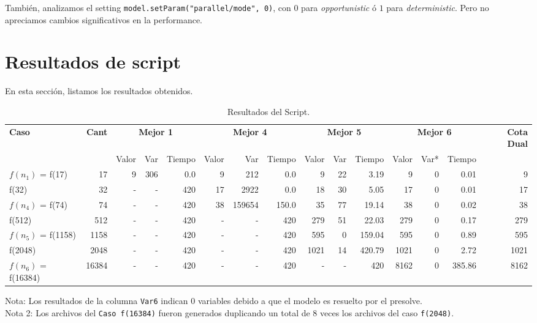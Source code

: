 \documentclass[11pt, a4paper, pdftex]{article}
\begin{document}
También, analizamos el setting \verb|model.setParam("parallel/mode", 0)|,
con $0$ para \emph{opportunistic} ó $1$ para \emph{deterministic}.
Pero no apreciamos cambios significativos en la performance.

\section{Resultados de script}

En esta sección, listamos los resultados obtenidos.

\newpage

\begin{landscape}
\begin{table}[h]
    \centering
    \begin{tabular}{l r r r r r r r r r r r r r r}
        \toprule
        \textbf{Caso} & \textbf{Cant} & \multicolumn{3}{c}{\textbf{Mejor 1}} & \multicolumn{3}{c}{\textbf{Mejor 4}} & \multicolumn{3}{c}{\textbf{Mejor 5}} & \multicolumn{3}{c}{\textbf{Mejor 6}} & \textbf{Cota Dual} \\
        \cmidrule(lr){3-5} \cmidrule(lr){6-8} \cmidrule(lr){9-11} \cmidrule(lr){12-14}
        & & Valor & Var & Tiempo & Valor & Var & Tiempo & Valor & Var & Tiempo & Valor & Var* & Tiempo & \\
        \midrule
        $f(n_1)$ = f(17) & 17 & 9 & 306 & 0.0 & 9 & 212 & 0.0 & 9 & 22 & 3.19 & 9 & 0 & 0.01 & 9 \\
        f(32) & 32 & - & - & 420 & 17 & 2922 & 0.0 & 18 & 30 & 5.05 & 17 & 0 & 0.01 & 17 \\
        $f(n_4)$ = f(74) & 74 & - & - & 420 & 38 & 159654 & 150.0 & 35 & 77 & 19.14 & 38 & 0 & 0.02 & 38 \\
        f(512) & 512 & - & - & 420 & - & - & 420 & 279 & 51 & 22.03 & 279 & 0 & 0.17 & 279 \\
        $f(n_5)$ = f(1158) & 1158 & - & - & 420 & - & - & 420 & 595 & 0 & 159.04 & 595 & 0 & 0.89 & 595 \\
        f(2048) & 2048 & - & - & 420 & - & - & 420 & 1021 & 14 & 420.79 & 1021 & 0 & 2.72 & 1021 \\
        $f(n_6)$ = f(16384) & 16384 & - & - & 420 & - & - & 420 & - & - & 420 & 8162 & 0 & 385.86 & 8162 \\
        \bottomrule
    \end{tabular}
    \caption{Resultados del Script. }
    \footnotesize{ Nota: Los resultados de la columna \texttt{Var6} indican 0 variables debido a que el modelo es resuelto por el presolve.}\\
    \footnotesize{ Nota 2: Los archivos del \texttt{Caso f(16384)} fueron generados duplicando un total de 8 veces los archivos del caso \texttt{f(2048)}.}
    \label{tab:resultados}
\end{table}
\end{landscape}
\end{document}

